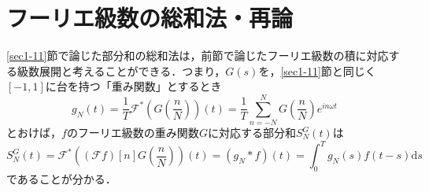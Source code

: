 \documentclass[a4j]{jsbook}
\numberwithin{theorem}{chapter}  %
\begin{document}
\section{フーリエ級数の総和法・再論} \label{sec2-5}
\ref{sec1-11}節で論じた部分和の総和法は，前節で論じたフーリエ級数の積に対応する級数展開と考えることができる．つまり，\(G(s)\)を，\ref{sec1-11}節と同じく\([-1, 1]\)に台を持つ「重み関数」とするとき
\begin{equation*}
    g_N(t)=\frac{1}{T}\mathcal{F}^*\left(G\left(\frac{n}{N}\right)\right)(t)=\frac{1}{T}\sum_{n=-N}^N G\left(\frac{n}{N}\right)e^{in\omega t}
\end{equation*}
とおけば，\(f\)のフーリエ級数の重み関数\(G\)に対応する部分和\(S_N^G(t)\)は
\begin{equation*}
    S_N^G(t)=\mathcal{F}^*\left((\mathcal{F}f)[n]G\left(\frac{n}{N}\right)\right)(t)=(g_N*f)(t)=\int_0^T g_N(s)f(t-s)\mathrm{d}s
\end{equation*}
であることが分かる．
\end{document}
